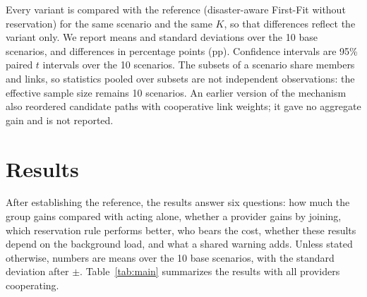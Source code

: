 \documentclass[11pt,a4paper]{article}
\theoremstyle{definition}
\begin{document}
Every variant is compared with the reference (disaster-aware First-Fit without reservation) for the same scenario and the same $K$, so that differences reflect the variant only.
We report means and standard deviations over the 10 base scenarios, and differences in percentage points (pp).
Confidence intervals are 95\% paired $t$ intervals over the 10 scenarios.
The subsets of a scenario share members and links, so statistics pooled over subsets are not independent observations: the effective sample size remains 10 scenarios.
An earlier version of the mechanism also reordered candidate paths with cooperative link weights; it gave no aggregate gain and is not reported.

\section{Results}
\label{sec:results}

After establishing the reference, the results answer six questions: how much the group gains compared with acting alone, whether a provider gains by joining, which reservation rule performs better, who bears the cost, whether these results depend on the background load, and what a shared warning adds.
Unless stated otherwise, numbers are means over the 10 base scenarios, with the standard deviation after $\pm$.
Table~\ref{tab:main} summarizes the results with all providers cooperating.
\end{document}

